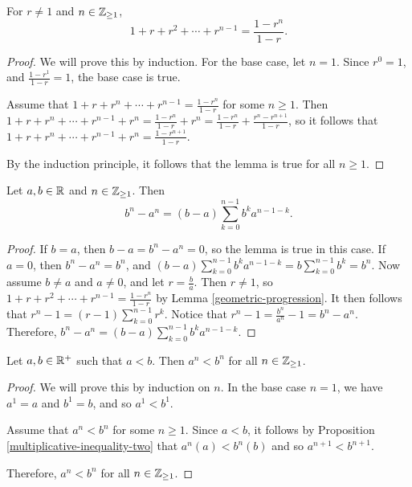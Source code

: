 \begin{lemma}\label{geometric-progression}
    For $r \neq 1$ and $n \in \mathbb{Z}_{\geq 1}$, \[1 + r + r^2 + \cdots + r^{n-1} = \frac{1-r^n}{1-r}.\]
\end{lemma}

\begin{proof}
    We will prove this by induction. For the base case, let $n = 1$. Since $r^0 = 1$, and $\frac{1-r^1}{1-r} = 1$, the base case is true.

    Assume that $1 + r + r^n + \cdots + r^{n-1} = \frac{1-r^n}{1-r}$ for some $n \geq 1$. Then $1 + r + r^n + \cdots + r^{n-1} + r^n = \frac{1-r^n}{1-r} + r^n = \frac{1-r^n}{1-r} + \frac{r^n - r^{n+1}}{1-r}$, so it follows that $1 + r + r^n + \cdots + r^{n-1} + r^n = \frac   {1-r^{n+1}}{1-r}$.

    By the induction principle, it follows that the lemma is true for all $n \geq 1$.
\end{proof}

\begin{lemma}\label{freshmans-reality}
    Let $a, b \in \mathbb{R}$ and $n \in \mathbb{Z}_{\geq 1}$. Then \[b^n - a^n = (b - a)\sum_{k=0}^{n-1} b^ka^{n-1-k}.\]
\end{lemma}

\begin{proof}
    If $b = a$, then $b - a = b^n - a^n = 0$, so the lemma is true in this case.
    If $a = 0$, then $b^n - a^n = b^n$, and $(b - a)\sum_{k=0}^{n-1} b^ka^{n-1-k} = b\sum_{k=0}^{n-1}b^k = b^n$. Now assume $b \neq a$ and $a \neq 0$, and let $r = \frac{b}{a}$. Then $r \neq 1$, so $1 + r + r^2 + \cdots + r^{n-1} = \frac{1-r^n}{1-r}$ by Lemma \ref{geometric-progression}. It then follows that $r^n-1 = (r-1)\sum_{k=0}^{n-1}r^k$. Notice that $r^n - 1 = \frac{b^n}{a^n} - 1 = b^n - a^n$. Therefore, $b^n - a^n = (b-a)\sum_{k=0}^{n-1}b^ka^{n-1-k}$.
\end{proof}

\begin{lemma}\label{exponent-inequality}
    Let $a, b \in \mathbb{R}^+$ such that $a < b$. Then $a^n < b^n$ for all $n \in \mathbb{Z}_{\geq 1}$.
\end{lemma}

\begin{proof}
    We will prove this by induction on $n$. In the base case $n=1$, we have $a^1 = a$ and $b^1 = b$, and so $a^1 < b^1$.

    Assume that $a^n < b^n$ for some $n \geq 1$. Since $a < b$, it follows by Proposition \ref{multiplicative-inequality-two} that $a^n(a) < b^n(b)$ and so $a^{n+1} < b^{n+1}$.

    Therefore, $a^n < b^n$ for all $n \in \mathbb{Z}_{\geq 1}$.
\end{proof}

